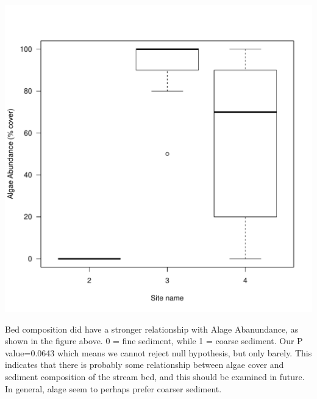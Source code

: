 \documentclass{article}
\begin{document}
\begin{knitrout}
\color{fgcolor}
\includegraphics[width=\maxwidth]{figure/unnamed-chunk-4-1} 

\end{knitrout}
Bed composition did have a stronger relationship with Alage Abanundance, as shown in the figure above. 0 = fine sediment, while 1 = coarse sediment. Our P value=0.0643 which means we cannot reject null hypothesis, but only barely. This indicates that there is probably some relationship between algae cover and sediment composition of the stream bed, and this should be examined in future. In general, alage seem to perhaps prefer coarser sediment. 
\end{document}
